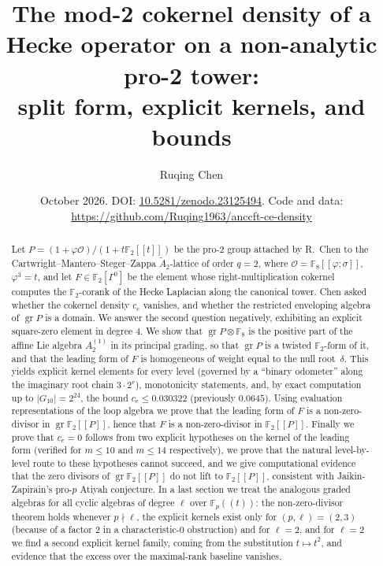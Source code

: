 \documentclass[11pt]{amsart}
\title[Mod-2 cokernel density on a non-analytic pro-2 tower]{The mod-2 cokernel density of a Hecke operator on a non-analytic pro-2 tower:\\ split form, explicit kernels, and bounds}
\author{Ruqing Chen}
\date{October 2026. DOI: \href{https://doi.org/10.5281/zenodo.23125494}{10.5281/zenodo.23125494}.
Code and data: \url{https://github.com/Ruqing1963/anccft-ce-density}}
\theoremstyle{definition}
\newcommand{\F}{\mathbb{F}}
\newcommand{\gr}{\operatorname{gr}}
\begin{document}
\begin{abstract}
Let $P=(1+\varphi\mathcal O)/(1+t\F_2[[t]])$ be the pro-2 group attached by R.~Chen to the
Cartwright--Mantero--Steger--Zappa $\tilde A_2$-lattice of order $q=2$, where $\mathcal O=\F_8[[\varphi;\sigma]]$,
$\varphi^3=t$, and let $F\in\F_2[\Gamma^0]$ be the element whose right-multiplication cokernel computes the
$\F_2$-corank of the Hecke Laplacian along the canonical tower. Chen asked whether the cokernel density
$c_e$ vanishes, and whether the restricted enveloping algebra of $\gr P$ is a domain.
We answer the second question negatively, exhibiting an explicit square-zero element in degree $4$.
We show that $\gr P\otimes\F_8$ is the positive part of the affine Lie algebra $A_2^{(1)}$ in its principal grading,
so that $\gr P$ is a twisted $\F_2$-form of it, and that the leading form of $F$ is homogeneous of weight
equal to the null root~$\delta$. This yields explicit kernel elements for every level (governed by a ``binary
odometer'' along the imaginary root chain $3\cdot 2^r$), monotonicity statements, and, by exact computation up to
$|G_{10}|=2^{24}$, the bound $c_e\le 0.030322$ (previously $0.0645$). Using evaluation representations of the loop
algebra we prove that the leading form of $F$ is a non-zero-divisor in $\gr\F_2[[P]]$, hence that $F$ is a
non-zero-divisor in $\F_2[[P]]$. Finally we prove that $c_e=0$ follows from two
explicit hypotheses on the kernel of the leading form (verified for $m\le10$ and $m\le14$ respectively), we prove that the
natural level-by-level route to these hypotheses cannot succeed, and we give computational evidence that the zero divisors of
$\gr\F_2[[P]]$ do not lift to $\F_2[[P]]$, consistent with Jaikin-Zapirain's pro-$p$ Atiyah conjecture.
In a last section we treat the analogous graded algebras for all cyclic algebras of degree $\ell$ over $\F_p((t))$:
the non-zero-divisor theorem holds whenever $p\nmid\ell$, the explicit kernels exist only for $(p,\ell)=(2,3)$ (because
of a factor $2$ in a characteristic-$0$ obstruction) and for $\ell=2$, and for $\ell=2$ we find a second explicit kernel
family, coming from the substitution $t\mapsto t^2$, and evidence that the excess over the maximal-rank baseline vanishes.
\end{abstract}

\maketitle

\tableofcontents
\end{document}
